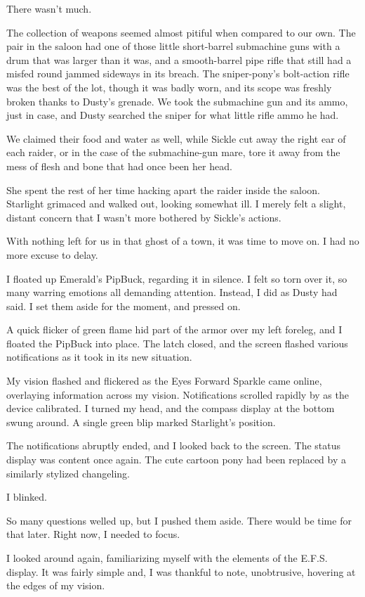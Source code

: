There wasn’t much.

The collection of weapons seemed almost pitiful when compared to our own. The pair in the saloon had one of those little short-barrel submachine guns with a drum that was larger than it was, and a smooth-barrel pipe rifle that still had a misfed round jammed sideways in its breach. The sniper-pony’s bolt-action rifle was the best of the lot, though it was badly worn, and its scope was freshly broken thanks to Dusty’s grenade. We took the submachine gun and its ammo, just in case, and Dusty searched the sniper for what little rifle ammo he had.

We claimed their food and water as well, while Sickle cut away the right ear of each raider, or in the case of the submachine-gun mare, tore it away from the mess of flesh and bone that had once been her head.

She spent the rest of her time hacking apart the raider inside the saloon. Starlight grimaced and walked out, looking somewhat ill. I merely felt a slight, distant concern that I wasn’t more bothered by Sickle’s actions.

With nothing left for us in that ghost of a town, it was time to move on. I had no more excuse to delay.

I floated up Emerald’s PipBuck, regarding it in silence. I felt so torn over it, so many warring emotions all demanding attention. Instead, I did as Dusty had said. I set them aside for the moment, and pressed on.

A quick flicker of green flame hid part of the armor over my left foreleg, and I floated the PipBuck into place. The latch closed, and the screen flashed various notifications as it took in its new situation.

My vision flashed and flickered as the Eyes Forward Sparkle came online, overlaying information across my vision. Notifications scrolled rapidly by as the device calibrated. I turned my head, and the compass display at the bottom swung around. A single green blip marked Starlight’s position.

The notifications abruptly ended, and I looked back to the screen. The status display was content once again. The cute cartoon pony had been replaced by a similarly stylized changeling.

I blinked.

So many questions welled up, but I pushed them aside. There would be time for that later. Right now, I needed to focus.

I looked around again, familiarizing myself with the elements of the E.F.S. display. It was fairly simple and, I was thankful to note, unobtrusive, hovering at the edges of my vision.

